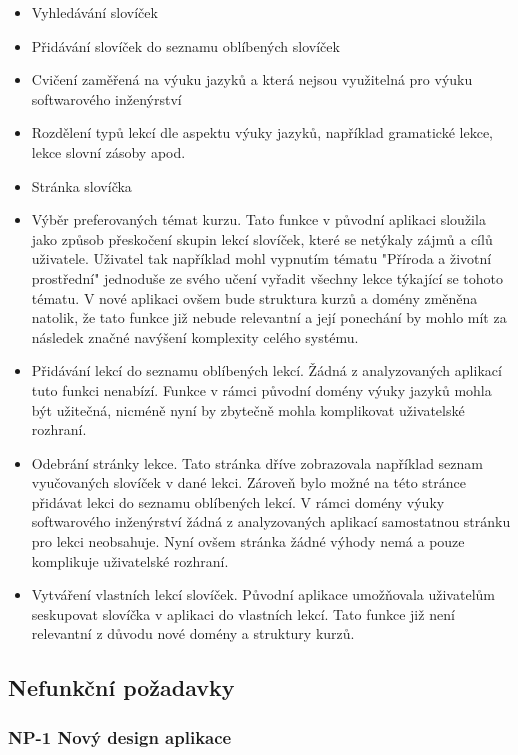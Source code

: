 \begin{itemize}
    \item Vyhledávání slovíček
    \item Přidávání slovíček do seznamu oblíbených slovíček
    \item Cvičení zaměřená na výuku jazyků a která nejsou využitelná pro výuku softwarového inženýrství
    \item Rozdělení typů lekcí dle aspektu výuky jazyků, například gramatické lekce, lekce slovní zásoby apod.
    \item Stránka slovíčka
    \item Výběr preferovaných témat kurzu. Tato funkce v původní aplikaci sloužila jako způsob přeskočení skupin lekcí slovíček, které se netýkaly zájmů a cílů uživatele. Uživatel tak například mohl vypnutím tématu "Příroda a životní prostřední" jednoduše ze svého učení vyřadit všechny lekce týkající se tohoto tématu. V nové aplikaci ovšem bude struktura kurzů a domény změněna natolik, že tato funkce již nebude relevantní a její ponechání by mohlo mít za následek značné navýšení komplexity celého systému.
    \item Přidávání lekcí do seznamu oblíbených lekcí. Žádná z analyzovaných aplikací tuto funkci nenabízí. Funkce v rámci původní domény výuky jazyků mohla být užitečná, nicméně nyní by zbytečně mohla komplikovat uživatelské rozhraní.
    \item Odebrání stránky lekce. Tato stránka dříve zobrazovala například seznam vyučovaných slovíček v dané lekci. Zároveň bylo možné na této stránce přidávat lekci do seznamu oblíbených lekcí. V rámci domény výuky softwarového inženýrství žádná z analyzovaných aplikací samostatnou stránku pro lekci neobsahuje. Nyní ovšem stránka žádné výhody nemá a pouze komplikuje uživatelské rozhraní.
    \item Vytváření vlastních lekcí slovíček. Původní aplikace umožňovala uživatelům seskupovat slovíčka v aplikaci do vlastních lekcí. Tato funkce již není relevantní z důvodu nové domény a struktury kurzů.
\end{itemize}

\subsection{Nefunkční požadavky}

\subsubsection{NP-1 Nový design aplikace}

